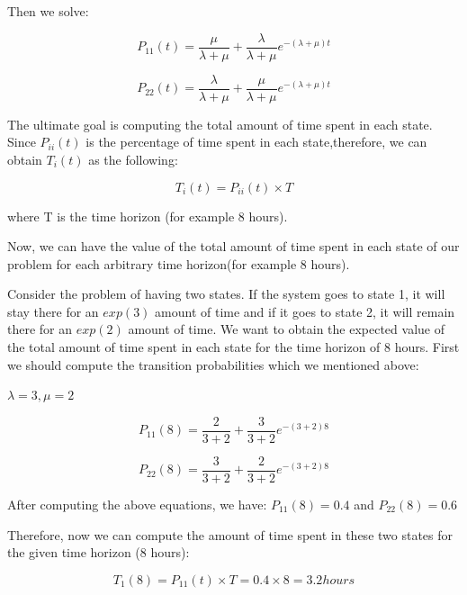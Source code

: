 \documentclass[12pt,letterpaper]{article}
\begin{document}
Then we solve:


\begin{equation}
P_{11}(t)=\frac{\mu}{\lambda +\mu}+\frac{\lambda}{\lambda +\mu} e^{-(\lambda +\mu)t}
\end{equation}

\begin{equation}
P_{22}(t)=\frac{\lambda}{\lambda +\mu}+\frac{\mu}{\lambda +\mu} e^{-(\lambda +\mu)t}
\end{equation}


The ultimate goal is computing the total amount of time spent in each state. Since $P_{ii}(t)$ is the percentage of time spent in each state,therefore, we can obtain $T_i(t)$ as the following:

\begin{equation}
T_i(t)=P_{ii}(t)\times T
\end{equation}

where T is the time horizon (for example 8 hours).


Now, we can have the value of the total amount of time spent in each state of our problem for each arbitrary time horizon(for example 8 hours).

Consider the problem of having two states.  If the system goes to state 1, it will stay there for an $exp(3)$ amount of time and if it goes to state 2, it will remain there for an $exp(2)$ amount of time. We want to obtain the expected value of the total amount of time spent in each state for the time horizon of 8 hours. First we should compute the transition probabilities which we mentioned above:


$\lambda=3, \mu=2$


\begin{equation}
P_{11}(8)=\frac{2}{3 +2}+\frac{3}{3 +2} e^{-(3 +2)8}
\end{equation}

\begin{equation}
P_{22}(8)=\frac{3}{3 +2}+\frac{2}{3 +2} e^{-(3 +2)8}
\end{equation}


After computing the above equations, we have:
$P_{11}(8)=0.4$ and $P_{22}(8)=0.6$


Therefore, now we can compute the amount of time spent in these two states for the given time horizon (8 hours):

\begin{equation}
T_1(8)=P_{11}(t)\times T= 0.4 \times 8=3.2 hours
\end{equation}
\end{document}
